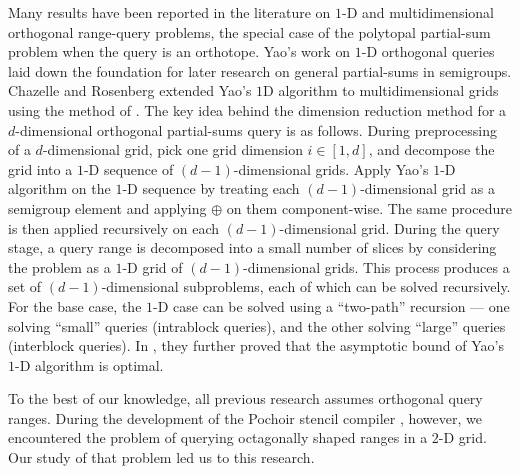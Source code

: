 Many results have been reported in the literature on $1$-D and
multidimensional orthogonal range-query problems, the special case
of the polytopal partial-sum problem when the query is an orthotope.
Yao's work \cite{Yao82, Yao85} on $1$-D orthogonal queries laid down
the foundation for later research on general partial-sums in semigroups.
Chazelle and Rosenberg \cite{ChazelleRo89} extended Yao's $1$D algorithm
to multidimensional grids using the method of .
The key idea behind the dimension reduction method for a $d$-dimensional
orthogonal partial-sums query is as follows.  During preprocessing of
a $d$-dimensional grid, pick one grid dimension $i \in [1, d]$, and
decompose the grid into a $1$-D sequence of $(d-1)$-dimensional grids.
Apply Yao's $1$-D algorithm on the $1$-D sequence by treating each
$(d-1)$-dimensional grid as a semigroup element and applying $\oplus$
on them component-wise.  The same procedure is then applied recursively
on each $(d-1)$-dimensional grid.  During the query stage, a query range
is decomposed into a small number of slices by considering the problem
as a $1$-D grid of $(d-1)$-dimensional grids.  This process produces
a set of $(d-1)$-dimensional subproblems, each of which can be solved
recursively.  For the base case, the $1$-D case can be solved using a
``two-path'' recursion --- one solving ``small'' queries (intrablock
queries), and the other solving ``large'' queries (interblock queries). In
\cite{ChazelleRo91}, they further proved that the asymptotic bound of
Yao's $1$-D algorithm is optimal.

To the best of our knowledge, all previous research assumes orthogonal
query ranges.  During the development of the Pochoir stencil compiler
\cite{TangChKu11, TangChLu11}, however, we encountered the problem of
querying octagonally shaped ranges in a $2$-D grid.  Our study of that
problem led us to this research.

